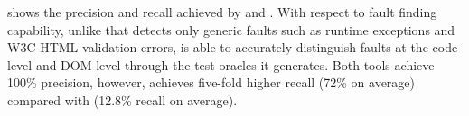  shows the precision and recall achieved by \tool and \artemis.
With respect to fault finding capability, unlike \artemis that detects only generic faults such as runtime exceptions and W3C HTML validation errors, \tool is able to accurately distinguish faults at the code-level and DOM-level through the test oracles it generates. Both tools achieve 100\% precision, however, \tool achieves five-fold higher recall (72\% on average) compared with \artemis (12.8\% recall on average). %
